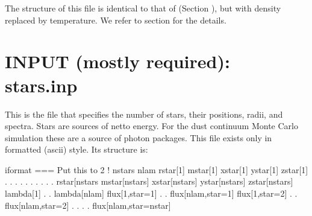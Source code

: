 \documentclass[letterpaper,10pt,english]{sphinxmanual}
\begin{document}
The structure of this file is identical to that of  (Section
{\hyperref[\detokenize{inputoutputfiles:sec-dustdens}]{}}), but with density replaced by temperature. We refer to
section {\hyperref[\detokenize{inputoutputfiles:sec-dustdens}]{}} for the details.


\section{INPUT (mostly required): stars.inp}
\label{\detokenize{inputoutputfiles:input-mostly-required-stars-inp}}\label{\detokenize{inputoutputfiles:sec-stars}}
This is the file that specifies the number of stars, their positions,
radii, and spectra. Stars are sources of netto energy. For the dust
continuum Monte Carlo simulation these are a source of photon packages.
This file exists only in formatted (ascii) style. Its structure is:

\begin{sphinxVerbatim}[commandchars=\\\{\}]
iformat                           \PYGZlt{}=== Put this to 2 !
nstars        nlam
rstar[1]      mstar[1]      xstar[1]      ystar[1]      zstar[1]
  .             .              .             .             .
  .             .              .             .             .
rstar[nstars  mstar[nstars] xstar[nstars] ystar[nstars] zstar[nstars]
lambda[1]
  .
  .
lambda[nlam]
flux[1,star=1]
  .
  .
flux[nlam,star=1]
flux[1,star=2]
  .
  .
flux[nlam,star=2]
  .
  .
  .
  .
flux[nlam,star=nstar]
\end{sphinxVerbatim}
\end{document}
